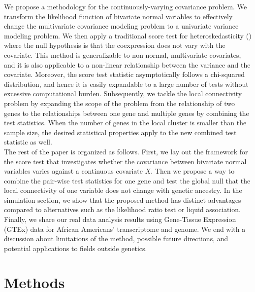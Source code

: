 \documentclass[aoas,authoryear, preprint]{imsart}
\numberwithin{equation}{section}
\theoremstyle{plain}
\begin{document}
We propose a methodology for the continuously-varying covariance problem. We transform the likelihood function of bivariate normal variables to effectively change the multivariate covariance modeling problem to a univariate variance modeling problem. We then apply a traditional score test for heteroskedasticity (\cite{breusch1979simple}) where the null hypothesis is that the coexpression does not vary with the covariate. This method is generalizable to non-normal, multivariate covariates, and it is also applicable to a non-linear relationship between the variance and the covariate. Moreover, the score test statistic asymptotically follows a chi-squared distribution, and hence it is easily expandable to a large number of tests without excessive computational burden. Subsequently, we tackle the local connectivity problem by expanding the scope of the problem from the relationship of two genes to the relationships between one gene and multiple genes by combining the test statistics. When the number of genes in the local cluster is smaller than the sample size, the desired statistical properties apply to the new combined test statistic as well. \\

The rest of the paper is organized as follows. First, we lay out the framework for the score test that investigates whether the covariance between bivariate normal variables varies against a continuous covariate $X$. Then we propose a way to combine the pair-wise test statistics for one gene and test the global null that the local connectivity of one variable does not change with genetic ancestry. In the simulation section, we show that the proposed method has distinct advantages compared to alternatives such as the likelihood ratio test or liquid association. Finally, we share our real data analysis results using Gene-Tissue Expression (GTEx) data for African Americans' transcriptome and genome. We end with a discussion about limitations of the method, possible future directions, and potential applications to fields outside genetics.

\section{Methods}
\end{document}
